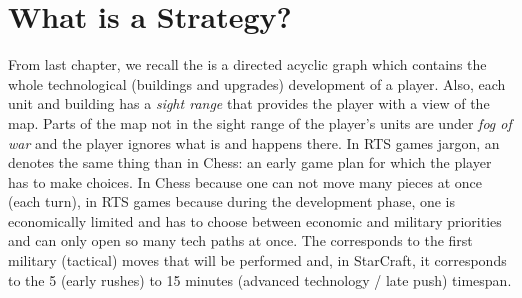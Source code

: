 \section{What is a Strategy?}


From last chapter, we recall the \textit{} is a directed acyclic graph which contains the whole technological (buildings and upgrades) development of a player. Also, each unit and building has a \textit{sight range} that provides the player with a view of the map. Parts of the map not in the sight range of the player's units are under \textit{fog of war} and the player ignores what is and happens there. In RTS games jargon, an \textit{} denotes the same thing than in Chess: an early game plan for which the player has to make choices. In Chess because one can not move many pieces at once (each turn), in RTS games because during the development phase, one is economically limited and has to choose between economic and military priorities and can only open so many tech paths at once. The  corresponds to the first military (tactical) moves that will be performed and, in StarCraft, it corresponds to the 5 (early rushes) to 15 minutes (advanced technology / late push) timespan. 

